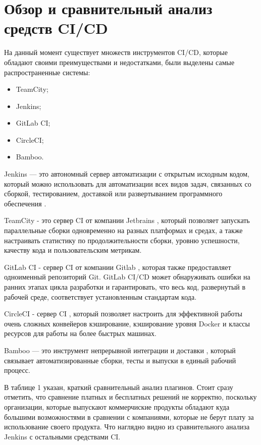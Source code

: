 \section{Обзор и сравнительный анализ средств CI/CD} \label{ch1:sec3}



На данный момент существует множеств инструментов CI/CD, которые обладают своими преимуществами и недостатками, были выделены самые распространенные системы:

\begin{itemize}
	\item TeamCity;
	\item Jenkins;
	\item GitLab CI;
	\item CircleCI;
	\item Bamboo.
\end{itemize}




Jenkins — это автономный сервер автоматизации с открытым исходным кодом, который можно использовать для автоматизации всех видов задач, связанных со сборкой, тестированием, доставкой или развертыванием программного обеспечения \cite{jenkins}.

TeamCity - это сервер CI от компании Jetbrains  \cite{tc}, который позволяет запускать параллельные сборки одновременно на разных платформах и средах, а также настраивать статистику по продолжительности сборки, уровню успешности, качеству кода и пользовательским метрикам.

GitLab CI - сервер CI от компании Gitlab \cite{gitlab}, которая также предоставляет одноименный репозиторий Git. GitLab CI/CD может обнаруживать ошибки на ранних этапах цикла разработки и гарантировать, что весь код, развернутый в рабочей среде, соответствует установленным стандартам кода.

CircleCI - сервер CI \cite{circle}, который позволяет настроить для эффективной работы очень сложных конвейеров кэширование, кэширование уровня Docker и классы ресурсов для работы на более быстрых машинах.

Bamboo — это инструмент непрерывной интеграции и доставки  \cite{bamboo}, который связывает автоматизированные сборки, тесты и выпуски в единый рабочий процесс.

В таблице 1 указан, краткий сравнительный анализ плагинов. Стоит сразу отметить, что сравнение платных и бесплатных решений не корректно, поскольку организации, которые выпускают коммерчиские продукты обладают куда большими возможностями в сравнении с компаниями, которые не берут плату за использование своего продукта. Что наглядно видно из сравнительного анализа Jenkins с остальными средствами CI.

